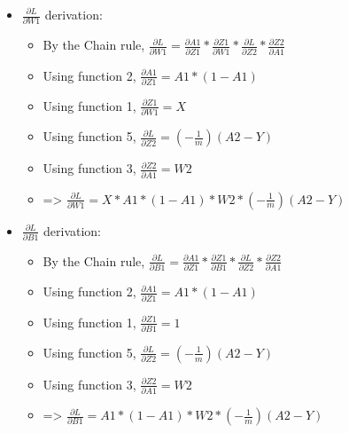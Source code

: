 \documentclass[10pt,a4paper]{article}
\begin{document}
\begin{itemize}
    \item $$ derivation:
    \begin{itemize}
        \item By the Chain rule, $ =  *  *  * $
        \item Using function 2, $ = A1 * (1-A1)$
        \item Using function 1, $ = X$
        \item Using function 5, $ = (-)(A2 - Y)$
        \item Using function 3, $ = W2$
        \item => $ = X * A1 * (1-A1) * W2 * (-)(A2-Y)$
    \end{itemize}
    \item $$ derivation:
    \begin{itemize}
        \item By the Chain rule, $ =  *  *  * $
        \item Using function 2, $ = A1 * (1-A1)$
        \item Using function 1, $ = 1$
        \item Using function 5, $ = (-)(A2 - Y)$
        \item Using function 3, $ = W2$
        \item => $ = A1 * (1-A1) * W2 * (-)(A2-Y)$
    \end{itemize}
\end{itemize}
\end{document}
